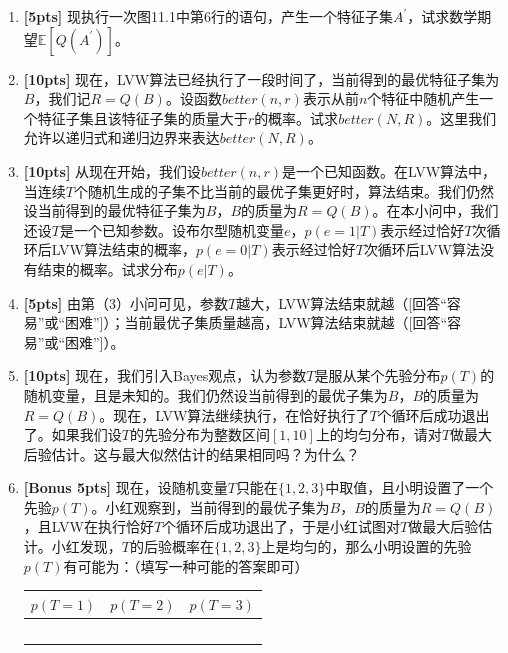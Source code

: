 \documentclass[a4paper,UTF8]{article}
\numberwithin{equation}{section}
\begin{document}
\begin{enumerate}[(1)]
\item \textbf{[5pts]} 现执行一次图11.1中第$6$行的语句，产生一个特征子集$A^\prime$，试求数学期望$\mathbb{E}[Q(A^\prime)]$。

\item \textbf{[10pts]} 现在，LVW算法已经执行了一段时间了，当前得到的最优特征子集为$B$，我们记$R=Q(B)$。设函数$better(n,r)$表示从前$n$个特征中随机产生一个特征子集且该特征子集的质量大于$r$的概率。试求$better(N,R)$。这里我们允许以递归式和递归边界来表达$better(N,R)$。
    
\item \textbf{[10pts]} 从现在开始，我们设$better(n,r)$是一个已知函数。在LVW算法中，当连续$T$个随机生成的子集不比当前的最优子集更好时，算法结束。我们仍然设当前得到的最优特征子集为$B$，$B$的质量为$R=Q(B)$。在本小问中，我们还设$T$是一个已知参数。设布尔型随机变量$e$，$p(e=1|T)$表示经过恰好$T$次循环后LVW算法结束的概率，$p(e=0|T)$表示经过恰好$T$次循环后LVW算法没有结束的概率。试求分布$p(e|T)$。

\item \textbf{[5pts]} 由第（3）小问可见，参数$T$越大，LVW算法结束就越（[回答“容易”或“困难”]）；当前最优子集质量越高，LVW算法结束就越（[回答“容易”或“困难”]）。

\item \textbf{[10pts]} 现在，我们引入Bayes观点，认为参数$T$是服从某个先验分布$p(T)$的随机变量，且是未知的。我们仍然设当前得到的最优子集为$B$，$B$的质量为$R=Q(B)$。现在，LVW算法继续执行，在恰好执行了$T$个循环后成功退出了。如果我们设$T$的先验分布为整数区间$[1, 10]$上的均匀分布，请对$T$做最大后验估计。这与最大似然估计的结果相同吗？为什么？

\item \textbf{[Bonus 5pts]} 现在，设随机变量$T$只能在$\{1,2,3\}$中取值，且小明设置了一个先验$p(T)$。小红观察到，当前得到的最优子集为$B$，$B$的质量为$R=Q(B)$，且LVW在执行恰好$T$个循环后成功退出了，于是小红试图对$T$做最大后验估计。小红发现，$T$的后验概率在$\{1,2,3\}$上是均匀的，那么小明设置的先验$p(T)$有可能为：（填写一种可能的答案即可）
\begin{table}
	\centering
    \begin{tabular}{|l|l|l|}
        \hline
        $p(T=1)$ & $p(T=2)$ & $p(T=3)$ \\ \hline
        ~      & ~      & ~      \\
        \hline
    \end{tabular}
\end{table}
\end{enumerate}
\end{document}
